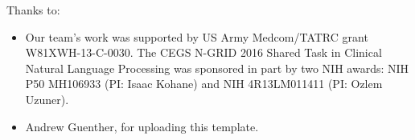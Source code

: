 \noindent
Thanks to:
\begin{itemize}
    \item Our team's work was supported by US Army Medcom/TATRC grant W81XWH-13-C-0030.
The CEGS N-GRID 2016 Shared Task in Clinical Natural Language Processing
 was sponsored in part by two NIH awards: NIH P50 MH106933 (PI: Isaac Kohane) and
NIH 4R13LM011411 (PI: Ozlem Uzuner).
    \item Andrew Guenther, for uploading this template.
\end{itemize}
